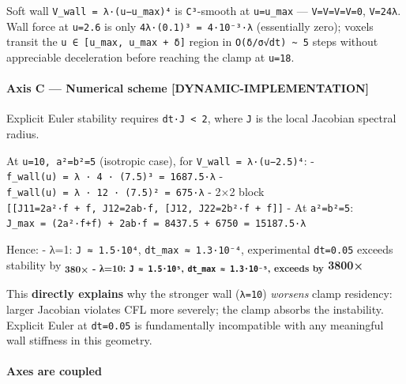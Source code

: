 \documentclass[
]{article}
\begin{document}
Soft wall \texttt{V\_wall\ =\ λ·(u−u\_max)⁴} is \texttt{C³}-smooth at
\texttt{u=u\_max} ---
\texttt{V=V\textquotesingle{}=V\textquotesingle{}\textquotesingle{}=V\textquotesingle{}\textquotesingle{}\textquotesingle{}=0},
\texttt{V\textquotesingle{}\textquotesingle{}\textquotesingle{}\textquotesingle{}=24λ}.
Wall force at \texttt{u=2.6} is only \texttt{4λ·(0.1)³\ =\ 4·10⁻³·λ}
(essentially zero); voxels transit the
\texttt{u\ ∈\ {[}u\_max,\ u\_max\ +\ δ{]}} region in
\texttt{O(δ/σ√dt)\ \textasciitilde{}\ 5} steps without appreciable
deceleration before reaching the clamp at \texttt{u=18}.

\hypertarget{axis-c-numerical-scheme-dynamic-implementation}{%
\paragraph{Axis C --- Numerical scheme
{[}DYNAMIC-IMPLEMENTATION{]}}\label{axis-c-numerical-scheme-dynamic-implementation}}

Explicit Euler stability requires
\texttt{dt·\textbar{}J\textbar{}\ \textless{}\ 2}, where \texttt{J} is
the local Jacobian spectral radius.

At \texttt{u=10,\ a²=b²=5} (isotropic case), for
\texttt{V\_wall\ =\ λ·(u−2.5)⁴}: -
\texttt{f\_wall(u)\ =\ λ\ ·\ 4\ ·\ (7.5)³\ =\ 1687.5·λ} -
\texttt{f\textquotesingle{}\_wall(u)\ =\ λ\ ·\ 12\ ·\ (7.5)²\ =\ 675·λ}
- 2×2 block
\texttt{{[}{[}J11=2a²·f\textquotesingle{}\ +\ f,\ J12=2ab·f\textquotesingle{}{]},\ {[}J12,\ J22=2b²·f\textquotesingle{}\ +\ f{]}{]}}
- At \texttt{a²=b²=5}:
\texttt{J\_max\ =\ (2a²·f\textquotesingle{}+f)\ +\ 2ab·f\textquotesingle{}\ =\ 8437.5\ +\ 6750\ =\ 15187.5·λ}

Hence: - λ=1: \texttt{J\ ≈\ 1.5·10⁴}, \texttt{dt\_max\ ≈\ 1.3·10⁻⁴},
experimental \texttt{dt=0.05} exceeds stability by
\textbf{\textsubscript{380×\textbf{ - λ=10: \texttt{J\ ≈\ 1.5·10⁵},
\texttt{dt\_max\ ≈\ 1.3·10⁻⁵}, exceeds by }}3800×}

This \textbf{directly explains} why the stronger wall (\texttt{λ=10})
\emph{worsens} clamp residency: larger Jacobian violates CFL more
severely; the clamp absorbs the instability. Explicit Euler at
\texttt{dt=0.05} is fundamentally incompatible with any meaningful wall
stiffness in this geometry.

\hypertarget{axes-are-coupled}{%
\paragraph{Axes are coupled}\label{axes-are-coupled}}
\end{document}

